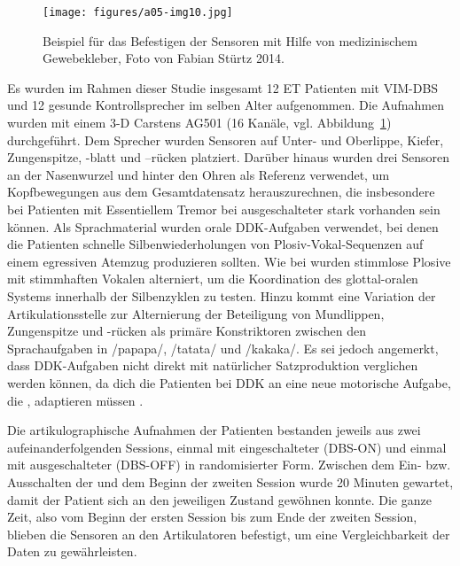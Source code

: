 \begin{figure}
	\texttt{[image: figures/a05-img10.jpg]}
	\caption{Beispiel für das Befestigen der Sensoren mit Hilfe von medizinischem Gewebekleber, Foto von Fabian Stürtz 2014.}
	\label{figure:0410}
\end{figure}

Es wurden im Rahmen dieser Studie insgesamt 12 ET Patienten mit VIM-DBS und 12 gesunde Kontrollsprecher im selben Alter aufgenommen. Die Aufnahmen wurden mit einem 3-D Carstens AG501 (16 Kanäle, vgl. Abbildung~\ref{figure:0410}) durchgeführt. Dem Sprecher wurden Sensoren auf Unter- und Oberlippe, Kiefer, Zungenspitze, -blatt und –rücken platziert. Darüber hinaus wurden drei Sensoren an der Nasenwurzel und hinter den Ohren als Referenz verwendet, um Kopfbewegungen aus dem Gesamtdatensatz herauszurechnen, die insbesondere bei Patienten mit Essentiellem Tremor bei ausgeschalteter  stark vorhanden sein können. Als Sprachmaterial wurden orale DDK-Aufgaben verwendet, bei denen die Patienten schnelle Silbenwiederholungen von Plosiv-Vokal-Sequenzen auf einem egressiven Atemzug produzieren sollten. Wie bei \citet{Pützer2007} wurden stimmlose Plosive mit stimmhaften Vokalen alterniert, um die Koordination des glottal-oralen Systems innerhalb der Silbenzyklen zu testen. Hinzu kommt eine Variation der Artikulationsstelle zur Alternierung der Beteiligung von Mundlippen, Zungenspitze und -rücken als primäre Konstriktoren zwischen den Sprachaufgaben in /papapa/, /tatata/ und /kakaka/. Es sei jedoch angemerkt, dass DDK-Aufgaben nicht direkt mit natürlicher Satzproduktion verglichen werden können, da dich die Patienten bei DDK an eine neue motorische Aufgabe, die , adaptieren müssen \citep{Staiger2016}.

Die artikulographische Aufnahmen der Patienten bestanden jeweils aus zwei aufeinanderfolgenden Sessions, einmal mit eingeschalteter (DBS-ON) und einmal mit ausgeschalteter  (DBS-OFF) in randomisierter Form. Zwischen dem Ein- bzw. Ausschalten der  und dem Beginn der zweiten Session wurde 20 Minuten gewartet, damit der Patient sich an den jeweiligen Zustand gewöhnen konnte. Die ganze Zeit, also vom Beginn der ersten Session bis zum Ende der zweiten Session, blieben die Sensoren an den Artikulatoren befestigt, um eine Vergleichbarkeit der Daten zu gewährleisten.

